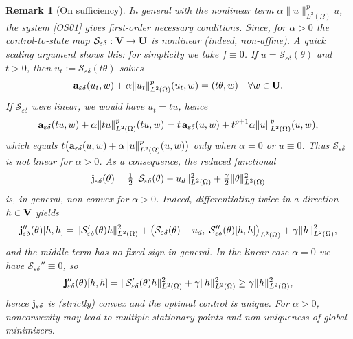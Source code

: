 \documentclass[11pt,a4paper]{article}
\numberwithin{equation}{section}
\def\wo{\overline}
\def\O{\Omega}
\def\e{\varepsilon}
\def\Ga{{\bf a}}
\def\Sc{{\mathcal{S}}}
\def\ed{{\varepsilon\delta}}
\def\Ga{{\bf a}}
\def\Gj{{\bf j}}
\def\GU{{\bf U}}
\def\GV{{\bf V}}
\newtheorem{remark}{Remark}
\begin{document}
		\begin{remark}[On sufficiency]
			In general with the nonlinear term $\alpha\|u\|_{L^2(\O)}^p u$, the system \eqref{OS01} gives
			first-order necessary conditions. Since, for $\alpha>0$ the control-to-state map $\Sc_\ed:\GV\to\GU$ is nonlinear (indeed, non-affine). 
			A quick scaling argument shows this: for simplicity we take $f\equiv 0$. If $u=\Sc_\ed(\theta)$ and $t>0$, then 
			$u_t:=\Sc_\ed(t\theta)$ solves
			\[
			\Ga_\ed(u_t,w)+\alpha\|u_t\|_{L^2(\Omega)}^{p}(u_t,w)=(t\theta,w)\quad\forall w\in\GU.
			\]
			If $\Sc_\ed$ were linear, we would have $u_t=tu$, hence
			\[
			\Ga_\ed(tu,w)+\alpha\|tu\|_{L^2(\O)}^{p}(tu,w)
			=t\,\Ga_\ed(u,w)+t^{p+1}\alpha\|u\|_{L^2(\O)}^{p}(u,w),
			\]
			which equals $t\big(\Ga_\ed(u,w)+\alpha\|u\|_{L^2(\O)}^{p}(u,w)\big)$ only when $\alpha=0$ or $u\equiv 0$. 
			Thus $\Sc_\ed$ is not linear for $\alpha>0$.
			As a consequence, the reduced functional 
			\[
			\Gj_\ed(\theta)=\tfrac12\|\Sc_\ed(\theta)-u_d\|_{L^2(\Omega)}^2+\tfrac{\gamma}{2}\|\theta\|_{L^2(\Omega)}^2
			\]
			is, in general, non-convex for $\alpha>0$. Indeed, differentiating twice in a direction $h\in\GV$ yields
			\[
			\Gj_\ed''(\theta)[h,h]
			=\|\Sc_\ed'(\theta)h\|_{L^2(\Omega)}^2
			+\big(\Sc_\ed(\theta)-u_d,\;\Sc_\ed''(\theta)[h,h]\big)_{L^2(\Omega)}
			+\gamma\|h\|_{L^2(\Omega)}^2,
			\]
			and the middle term has no fixed sign in general. In the linear case $\alpha=0$ we have $\Sc_\ed''\equiv 0$, so
			\[
			\Gj_\ed''(\theta)[h,h]=\|\Sc_\ed'(\theta)h\|_{L^2(\O)}^2+\gamma\|h\|_{L^2(\O)}^2\ge \gamma\|h\|_{L^2(\O)}^2,
			\]
			hence $\Gj_\ed$ is (strictly) convex and the optimal control is unique. For $\alpha>0$, nonconvexity may lead to
			multiple stationary points and non-uniqueness of global minimizers.
		\end{remark}
\end{document}
